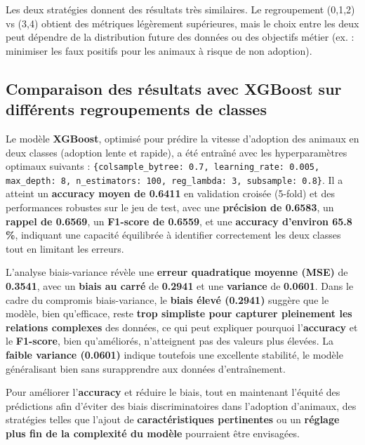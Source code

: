 \documentclass[a4paper,12pt]{article}
\begin{document}
Les deux stratégies donnent des résultats très similaires. Le regroupement (0,1,2) vs (3,4) obtient des métriques légèrement supérieures, mais le choix entre les deux peut dépendre de la distribution future des données ou des objectifs métier (ex. : minimiser les faux positifs pour les animaux à risque de non adoption).



\subsection{Comparaison des résultats avec XGBoost sur différents regroupements de classes}
 
Le modèle \textbf{XGBoost}, optimisé pour prédire la vitesse d'adoption des animaux en deux classes (adoption lente et rapide), a été entraîné avec les hyperparamètres optimaux suivants : \texttt{\{colsample\_bytree: 0.7, learning\_rate: 0.005, max\_depth: 8, n\_estimators: 100, reg\_lambda: 3, subsample: 0.8\}}. Il a atteint un \textbf{accuracy moyen de 0.6411} en validation croisée (5-fold) et des performances robustes sur le jeu de test, avec une \textbf{précision de 0.6583}, un \textbf{rappel de 0.6569}, un \textbf{F1-score de 0.6559}, et une \textbf{accuracy d’environ 65.8\,\%}, indiquant une capacité équilibrée à identifier correctement les deux classes tout en limitant les erreurs.
 
L'analyse biais-variance révèle une \textbf{erreur quadratique moyenne (MSE)} de \textbf{0.3541}, avec un \textbf{biais au carré} de \textbf{0.2941} et une \textbf{variance} de \textbf{0.0601}. Dans le cadre du compromis biais-variance, le \textbf{biais élevé (0.2941)} suggère que le modèle, bien qu’efficace, reste \textbf{trop simpliste pour capturer pleinement les relations complexes} des données, ce qui peut expliquer pourquoi l’\textbf{accuracy} et le \textbf{F1-score}, bien qu’améliorés, n’atteignent pas des valeurs plus élevées. La \textbf{faible variance (0.0601)} indique toutefois une excellente stabilité, le modèle généralisant bien sans surapprendre aux données d’entraînement.
 
Pour améliorer l’\textbf{accuracy} et réduire le biais, tout en maintenant l’équité des prédictions afin d’éviter des biais discriminatoires dans l’adoption d’animaux, des stratégies telles que l’ajout de \textbf{caractéristiques pertinentes} ou un \textbf{réglage plus fin de la complexité du modèle} pourraient être envisagées.
 
\end{document}
